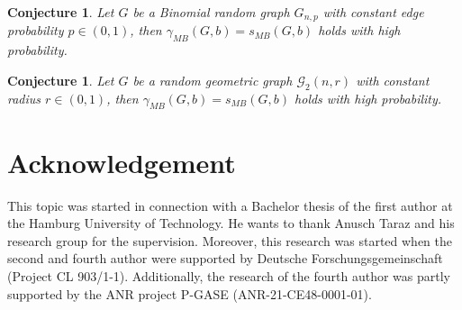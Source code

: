 \documentclass[reqno, 12pt]{amsart}
\numberwithin{equation}{section}
\numberwithin{figure}{section}
\newtheorem{conjecture}[theorem]{Conjecture}
\begin{document}
\begin{conjecture}
 Let $G$ be a Binomial random graph $G_{n,p}$ with constant edge probability $p\in (0,1)$,
 then $\gamma_{MB}(G,b) = s_{MB}(G,b)$
 holds with high probability.
\end{conjecture}

\begin{conjecture}
 Let $G$ be a random geometric graph $\mathcal{G}_2(n,r)$ with constant radius $r\in (0,1)$,
 then $\gamma_{MB}(G,b) = s_{MB}(G,b)$
 holds with high probability.
\end{conjecture}

\section*{Acknowledgement}
This topic was started
in connection with a Bachelor thesis of the first author at the Hamburg University of Technology. He wants to thank Anusch Taraz and his research group for the supervision.
Moreover, this research was started when the second and fourth author were supported 
by Deutsche Forschungsgemeinschaft (Project CL 903/1-1). Additionally, the research of the fourth author was partly supported by the ANR project P-GASE (ANR-21-CE48-0001-01).






\bigskip\bigskip\bigskip

\address{Hamburg University of Technology, Germany.} \\
{\scriptsize {}} \\[2pt]
\address{Universit\'e Claude Bernard Lyon 1, France.}\\
{\scriptsize {}}
\end{document}
